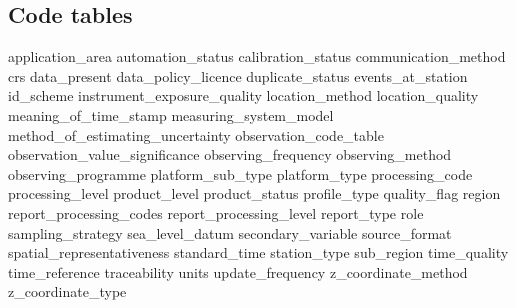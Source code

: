 \documentclass[a4paper,11pt]{article}
\begin{document}
\subsection {Code tables}
 {application_area}
 {automation_status}
 {calibration_status}
 {communication_method}
 {crs}
 {data_present}
 {data_policy_licence}
 {duplicate_status}
 {events_at_station}
 {id_scheme}
 {instrument_exposure_quality}
 {location_method}
 {location_quality}
 {meaning_of_time_stamp}
 {measuring_system_model}
 {method_of_estimating_uncertainty}
 {observation_code_table}
 {observation_value_significance}
 {observing_frequency}
 {observing_method}
 {observing_programme}
 {platform_sub_type}
 {platform_type}
 {processing_code}
 {processing_level}
 {product_level}
 {product_status}
 {profile_type}
 {quality_flag}
 {region}
 {report_processing_codes}
 {report_processing_level}
 {report_type}
 {role}
 {sampling_strategy}
 {sea_level_datum}
 {secondary_variable}
 {source_format}
 {spatial_representativeness}
 {standard_time}
 {station_type}
 {sub_region}
 {time_quality}
 {time_reference}
 {traceability}
 {units}
 {update_frequency}
 {z_coordinate_method}
 {z_coordinate_type}

\end{document}
